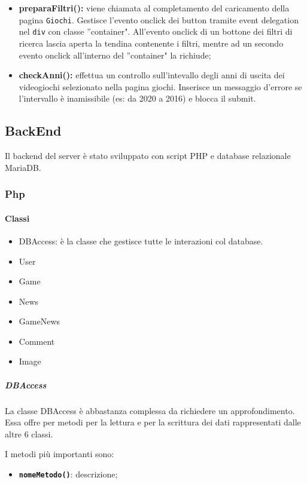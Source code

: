 \begin{itemize}
	\item \textbf{preparaFiltri(): } viene chiamata al completamento del caricamento della pagina \texttt{Giochi}. Gestisce l'evento onclick dei button tramite event delegation nel \texttt{div} con classe ''container". All'evento onclick di un bottone dei filtri di ricerca lascia aperta la tendina contenente i filtri, mentre ad un secondo evento onclick all'interno del ''container" la richiude; \\

	\item \textbf{checkAnni(): } effettua un controllo sull'intevallo degli anni di uscita dei videogiochi selezionato nella pagina giochi.
	Inserisce un messaggio d'errore se l'intervallo è inamissibile (es: da 2020 a 2016) e blocca il submit. \\
\end{itemize}




\subsection{BackEnd}
Il backend del server è stato sviluppato con script PHP e database relazionale MariaDB.

\subsubsection{Php}

\paragraph{Classi}
\begin{itemize}
	\item DBAccess: è la classe che gestisce tutte le interazioni col database.
	\item User
	\item Game
	\item News
	\item GameNews
	\item Comment
	\item Image
\end{itemize}

\subparagraph{DBAccess} 
La classe DBAccess è abbastanza complessa da richiedere un approfondimento.
Essa offre per metodi per la lettura e per la scrittura dei dati rappresentati dalle altre 6 classi.

I metodi più importanti sono:
\begin{itemize}
	\item \textbf{\texttt{nomeMetodo()}}: descrizione;

\end{itemize}

